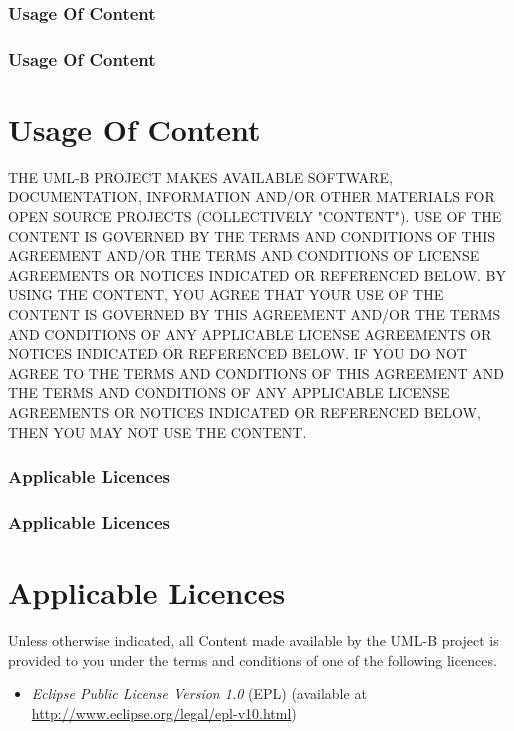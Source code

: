 
\ifplastex
\subsubsection{Usage Of Content}
\label{sec:usage-content}
\else
  \ifstandalone
  \subsubsection{Usage Of Content}
  \label{sec:usage-content}
  \else
  \section{Usage Of Content}
  \label{sec:usage-content}
  \fi
\fi

 THE UML-B PROJECT MAKES AVAILABLE SOFTWARE, DOCUMENTATION, INFORMATION AND/OR OTHER MATERIALS FOR OPEN SOURCE PROJECTS (COLLECTIVELY "CONTENT"). USE OF THE CONTENT IS GOVERNED BY THE TERMS AND CONDITIONS OF THIS AGREEMENT AND/OR THE TERMS AND CONDITIONS OF LICENSE AGREEMENTS OR NOTICES INDICATED OR REFERENCED BELOW. BY USING THE CONTENT, YOU AGREE THAT YOUR USE OF THE CONTENT IS GOVERNED BY THIS AGREEMENT AND/OR THE TERMS AND CONDITIONS OF ANY APPLICABLE LICENSE AGREEMENTS OR NOTICES INDICATED OR REFERENCED BELOW. IF YOU DO NOT AGREE TO THE TERMS AND CONDITIONS OF THIS AGREEMENT AND THE TERMS AND CONDITIONS OF ANY APPLICABLE LICENSE AGREEMENTS OR NOTICES INDICATED OR REFERENCED BELOW, THEN YOU MAY NOT USE THE CONTENT.

\ifplastex
\subsubsection{Applicable Licences}
\label{sec:umlb-applicable-licences}
\else
  \ifstandalone
  \subsubsection{Applicable Licences}
  \label{sec:umlb-applicable-licences}
  \else
  \section{Applicable Licences}
  \label{sec:umlb-applicable-licences}
  \fi
\fi
 
Unless otherwise indicated, all Content made available by the UML-B project is provided to you under the terms and conditions of one of
the following licences.

\begin{itemize}
\item \emph{Eclipse Public License Version 1.0} (EPL) (available at 
   \url{http://www.eclipse.org/legal/epl-v10.html})
\end{itemize}

